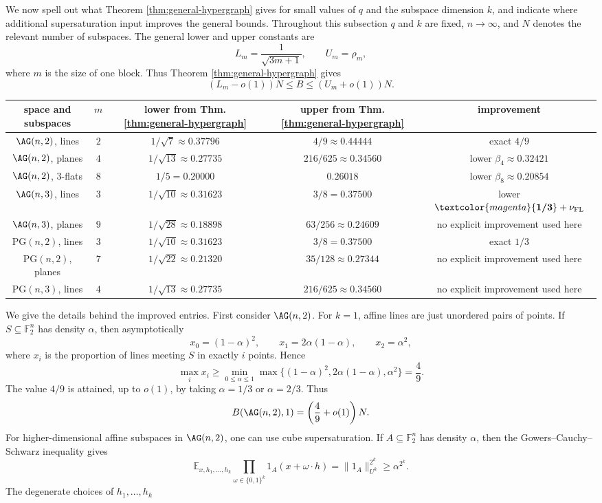 \documentclass[10pt]{article}
\newcommand{\PG}{\mathrm{PG}}
\theoremstyle{definition}
\newcommand{\zs}[1]{\textcolor{magenta}{\textbf{#1}}}
\begin{document}
	We now spell out what Theorem \ref{thm:general-hypergraph} gives for small values of \(q\) and the subspace dimension \(k\), and indicate where additional supersaturation input improves the general bounds. Throughout this subsection \(q\) and \(k\) are fixed, \(n\to\infty\), and \(N\) denotes the relevant number of subspaces. The general lower and upper constants are \[ L_m=\frac{1}{\sqrt{3m+1}}, \qquad U_m=\rho_m, \] where \(m\) is the size of one block. Thus Theorem \ref{thm:general-hypergraph} gives \[ (L_m-o(1))N \leq B \leq (U_m+o(1))N. \] \begin{center} \begin{tabular}{|c|c|c|c|c|} \hline space and subspaces & \(m\) & lower from Thm. \ref{thm:general-hypergraph} & upper from Thm. \ref{thm:general-hypergraph} & improvement \\ \hline \(\AG(n,2)\), lines & \(2\) & \(1/\sqrt7\approx0.37796\) & \(4/9\approx0.44444\) & exact \(4/9\) \\ \hline \(\AG(n,2)\), planes & \(4\) & \(1/\sqrt{13}\approx0.27735\) & \(216/625\approx0.34560\) & lower \(\beta_4\approx0.32421\) \\ \hline \(\AG(n,2)\), \(3\)-flats & \(8\) & \(1/5=0.20000\) & \(0.26018\) & lower \(\beta_8\approx0.20854\) \\ \hline \(\AG(n,3)\), lines & \(3\) & \(1/\sqrt{10}\approx0.31623\) & \(3/8=0.37500\) & lower \(\zs{1/3} +\nu_{\rm FL}\) \\ \hline \(\AG(n,3)\), planes & \(9\) & \(1/\sqrt{28}\approx0.18898\) & \(63/256\approx0.24609\) & no explicit improvement used here \\ \hline \(\PG(n,2)\), lines & \(3\) & \(1/\sqrt{10}\approx0.31623\) & \(3/8=0.37500\) & exact \(1/3\) \\ \hline \(\PG(n,2)\), planes & \(7\) & \(1/\sqrt{22}\approx0.21320\) & \(35/128\approx0.27344\) & no explicit improvement used here \\ \hline \(\PG(n,3)\), lines & \(4\) & \(1/\sqrt{13}\approx0.27735\) & \(216/625\approx0.34560\) & no explicit improvement used here \\ \hline \end{tabular} \end{center} We give the details behind the improved entries. First consider \(\AG(n,2)\). For \(k=1\), affine lines are just unordered pairs of points. If \(S\subseteq\mathbb F_2^n\) has density \(\alpha\), then asymptotically \[ x_0=(1-\alpha)^2,\qquad x_1=2\alpha(1-\alpha),\qquad x_2=\alpha^2, \] where \(x_i\) is the proportion of lines meeting \(S\) in exactly \(i\) points. Hence \[ \max_i x_i \geq \min_{0\leq\alpha\leq1} \max\{(1-\alpha)^2,2\alpha(1-\alpha),\alpha^2\} = \frac49. \] The value \(4/9\) is attained, up to \(o(1)\), by taking \(\alpha=1/3\) or \(\alpha=2/3\). Thus \[ B(\AG(n,2),1) = \left(\frac49+o(1)\right)N. \] For higher-dimensional affine subspaces in \(\AG(n,2)\), one can use cube supersaturation. If \(A\subseteq\mathbb F_2^n\) has density \(\alpha\), then the Gowers--Cauchy--Schwarz inequality gives \[ \mathbb E_{x,h_1,\ldots,h_k} \prod_{\omega\in\{0,1\}^k} 1_A(x+\omega\cdot h) = \|1_A\|_{U^k}^{2^k} \geq \alpha^{2^k}. \] The degenerate choices of \(h_1,\ldots,h_k\) 
\end{document}
